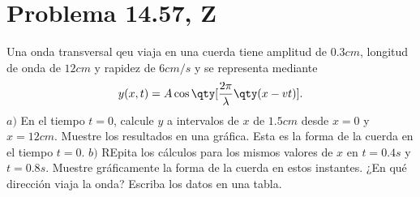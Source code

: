 \section*{Problema 14.57, Z}

\noindent Una onda transversal qeu viaja en una cuerda tiene amplitud de $0.3 cm$, longitud de onda de $12cm$ y rapidez de $6cm/s$ y se representa mediante 
	$$ y(x,t) = A\cos{\qty[\frac{2\pi}{\lambda} \qty(x - vt)]}. $$
\noindent $a)$ En el tiempo $t = 0$, calcule $y$ a intervalos de $x$ de $1.5cm$ desde $x = 0$ y $x = 12cm$. Muestre los resultados en una gráfica. Esta es la forma de la cuerda en el tiempo $t = 0$. $b)$ REpita los cálculos para los mismos valores de $x$ en $t = 0.4s$ y $t = 0.8s$. Muestre gráficamente la forma de la cuerda en estos instantes. ¿En qué dirección viaja la onda? Escriba los datos en una tabla.







